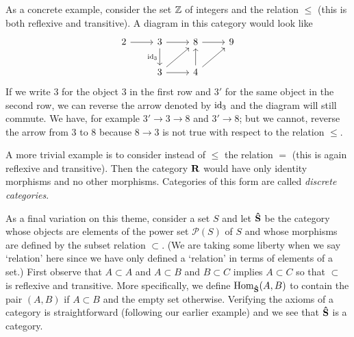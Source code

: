 \begin{example}
    As a concrete example, consider the set \(\mathbb{Z}\) of integers and the relation
    \(\leq\) (this is both reflexive and transitive). A diagram in this category
    would look like
    \[
        \begin{tikzcd}
            2 \arrow[r] & 3 \arrow[r] \arrow[d, "\id_3"'] & 8 \arrow[r]            & 9 \\
                        & 3 \arrow[r] \arrow[ru]          & 4 \arrow[u] \arrow[ru] &  
        \end{tikzcd}
    \]
    If we write \(3\) for the object \(3\) in the first row and \(3'\) for the
    same object in the second row, we can reverse the arrow denoted by \(\operatorname{id}_3\)
    and the diagram will still commute. We have, for example \(3' \to 3 \to 8\)
    and \(3' \to 8\); but we cannot, reverse the arrow from \(3\) to \(8\)
    because \(8 \to 3\) is not true with respect to the relation \(\leq\).

    A more trivial example is to consider instead of \(\leq\) the relation \(=\)
    (this is again reflexive and transitive). Then the category \(\mathbf{R}\)
    would have only identity morphisms and no other morphisms. Categories of
    this form are called \emph{discrete categories}.

    As a final variation on this theme, consider a set \(S\) and let
    \(\mathbf{\hat{S}}\) be the category whose objects are elements of the power
    set \(\mathcal{P}(S)\) of \(S\) and whose morphisms are defined by the
    subset relation \(\subset\). (We are taking some liberty when we say
    `relation' here since we have only defined a `relation' in terms of elements
    of a set.) First observe that \(A \subset A\) and \(A \subset B\) and \(B
    \subset C\) implies \(A \subset C\) so that \(\subset\) is reflexive and
    transitive. More specifically, we define \(\operatorname{Hom}_{\mathbf{\hat{S}}}(A, B)\) to
    contain the pair \((A, B)\) if \(A \subset B\) and the empty set otherwise.
    Verifying the axioms of a category is straightforward (following our earlier
    example) and we see that \(\mathbf{\hat{S}}\) is a category.
\end{example}

